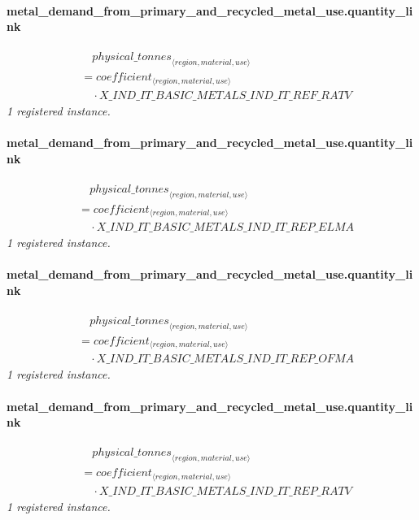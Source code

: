\documentclass[11pt]{article}
\begin{document}
\paragraph{metal\_demand\_from\_primary\_and\_recycled\_metal\_use.quantity\_link}
\begin{align*}
&\quad {physical\_tonnes}_{\langle region, material, use\rangle}\\
&= coefficient_{\langle region, material, use\rangle}\\
&\quad {}\cdot X\_IND\_IT\_BASIC\_METALS\_IND\_IT\_REF\_RATV
\end{align*}
\noindent\emph{1 registered instance.}\par
\paragraph{metal\_demand\_from\_primary\_and\_recycled\_metal\_use.quantity\_link}
\begin{align*}
&\quad {physical\_tonnes}_{\langle region, material, use\rangle}\\
&= coefficient_{\langle region, material, use\rangle}\\
&\quad {}\cdot X\_IND\_IT\_BASIC\_METALS\_IND\_IT\_REP\_ELMA
\end{align*}
\noindent\emph{1 registered instance.}\par
\paragraph{metal\_demand\_from\_primary\_and\_recycled\_metal\_use.quantity\_link}
\begin{align*}
&\quad {physical\_tonnes}_{\langle region, material, use\rangle}\\
&= coefficient_{\langle region, material, use\rangle}\\
&\quad {}\cdot X\_IND\_IT\_BASIC\_METALS\_IND\_IT\_REP\_OFMA
\end{align*}
\noindent\emph{1 registered instance.}\par
\paragraph{metal\_demand\_from\_primary\_and\_recycled\_metal\_use.quantity\_link}
\begin{align*}
&\quad {physical\_tonnes}_{\langle region, material, use\rangle}\\
&= coefficient_{\langle region, material, use\rangle}\\
&\quad {}\cdot X\_IND\_IT\_BASIC\_METALS\_IND\_IT\_REP\_RATV
\end{align*}
\noindent\emph{1 registered instance.}\par
\end{document}

